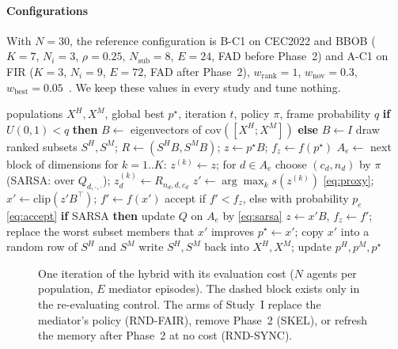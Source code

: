 \paragraph{Configurations} With $N=30$, the reference configuration is B-C1 on CEC2022 and BBOB ($K=7$,
$N_i=3$, $\rho=0.25$, $N_\mathrm{sub}=8$, $E=24$, FAD before Phase~2) and A-C1 on FIR ($K=3$, $N_i=9$, $E=72$, FAD after
Phase~2), $w_\mathrm{rank}=1$, $w_\mathrm{nov}=0.3$, $w_\mathrm{best}=0.05$~\citep{flores2026mphbs}. We keep these values
in every study and tune nothing.

\begin{algorithm}[!htbp]
\caption{Phase 2 (mediator) with policy $\pi\in\{\text{SARSA},\text{uniform}\}$ and frame probability $q$ ($q=0$: axis frame).}
\label{alg:mediator}
\small
\begin{algorithmic}[1]
\Require populations $X^H,X^M$, global best $p^\star$, iteration $t$, policy $\pi$, frame probability $q$
\State \textbf{if} $U(0,1)<q$ \textbf{then} $B\gets$ eigenvectors of $\mathrm{cov}([X^H;X^M])$ \textbf{else} $B\gets I$
 \label{line:frame}
\State draw ranked subsets $S^H,S^M$; $R\gets(S^HB,S^MB)$; $z\gets p^\star B$; $f_z\gets f(p^\star)$ 
  \State $A_e\gets$ next block of dimensions
  \State for $k=1..K$: $z^{(k)}\gets z$; for $d\in A_e$ choose $(c_d,n_d)$ by $\pi$ (SARSA: over $Q_{d,\cdot,\cdot}$);
    $z^{(k)}_d\gets R_{n_d,d,c_d}$ \label{line:policy}
  \State $z'\gets\arg\max_k s(z^{(k)})$ \eqref{eq:proxy}; $x'\gets\mathrm{clip}(z'B^\top)$; $f'\gets f(x')$ 
  \State accept if $f'<f_z$, else with probability $p_e$ \eqref{eq:accept}
  \State \textbf{if} SARSA \textbf{then} update $Q$ on $A_e$ by \eqref{eq:sarsa} \label{line:sarsa}
   $z\gets x'B$, $f_z\gets f'$; replace the worst subset members that $x'$ improves\EndIf
   $p^\star\gets x'$; copy $x'$ into a random row of $S^H$ and $S^M$\EndIf
\EndFor
\State write $S^H,S^M$ back into $X^H,X^M$; update $p^H,p^M,p^\star$
\end{algorithmic}
\end{algorithm}

\begin{figure}[!htbp]
\centering
\resizebox{0.66\textwidth}{!}{}
\caption{One iteration of the hybrid with its evaluation cost ($N$ agents per population, $E$ mediator episodes). The dashed
block exists only in the re-evaluating control. The arms of Study~I replace the mediator's policy (RND-FAIR), remove
Phase~2 (SKEL), or refresh the memory after Phase~2 at no cost (RND-SYNC).}
\label{fig:loop}
\end{figure}

